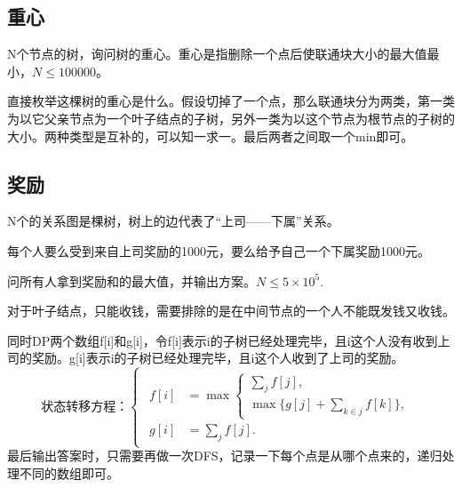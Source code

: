 \documentclass{article}
\begin{document}
\subsection{重心}
N个节点的树，询问树的重心。重心是指删除一个点后使联通块大小的最大值最小，$N\le 100000$。

直接枚举这棵树的重心是什么。假设切掉了一个点，那么联通块分为两类，第一类为以它父亲节点为一个叶子结点的子树，另外一类为以这个节点为根节点的子树的大小。两种类型是互补的，可以知一求一。最后两者之间取一个min即可。
\subsection{奖励}
N个的关系图是棵树，树上的边代表了“上司——下属”关系。

每个人要么受到来自上司奖励的1000元，要么给予自己一个下属奖励1000元。

问所有人拿到奖励和的最大值，并输出方案。$N\le 5\times 10^5$.

对于叶子结点，只能收钱，需要排除的是在中间节点的一个人不能既发钱又收钱。

同时DP两个数组f[i]和g[i]，令f[i]表示i的子树已经处理完毕，且i这个人没有收到上司的奖励。g[i]表示i的子树已经处理完毕，且i这个人收到了上司的奖励。
\begin{equation*}
    状态转移方程：
    \begin{cases}
        \begin{aligned}
            f[i]&=\max
            \begin{cases}
                \sum_jf[j],\\
                \max\{g[j]+\sum_{k\in j}f[k]\},
            \end{cases}
            \\
            g[i]&=\sum_jf[j].
        \end{aligned}
    \end{cases}
\end{equation*}
最后输出答案时，只需要再做一次DFS，记录一下每个点是从哪个点来的，递归处理不同的数组即可。
\end{document}
